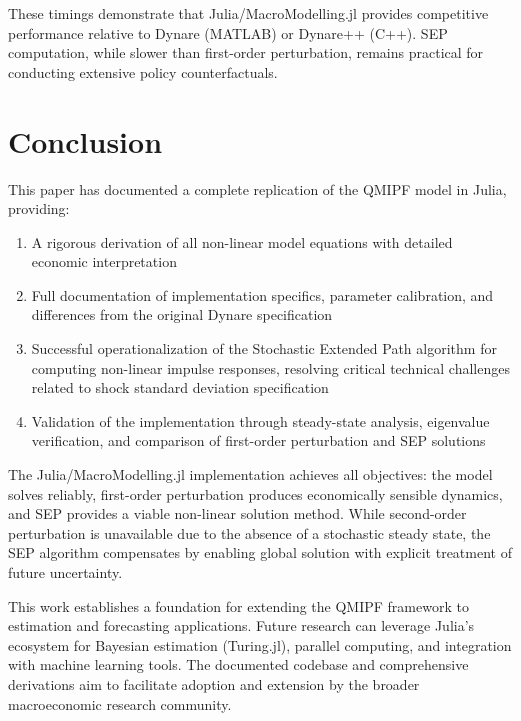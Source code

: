 \documentclass[12pt]{article}
\begin{document}
These timings demonstrate that Julia/MacroModelling.jl provides competitive performance relative to Dynare (MATLAB) or Dynare++ (C++). SEP computation, while slower than first-order perturbation, remains practical for conducting extensive policy counterfactuals.

\section{Conclusion}\label{sec:conclusion}

This paper has documented a complete replication of the QMIPF model in Julia, providing:
\begin{enumerate}
\item A rigorous derivation of all non-linear model equations with detailed economic interpretation
\item Full documentation of implementation specifics, parameter calibration, and differences from the original Dynare specification
\item Successful operationalization of the Stochastic Extended Path algorithm for computing non-linear impulse responses, resolving critical technical challenges related to shock standard deviation specification
\item Validation of the implementation through steady-state analysis, eigenvalue verification, and comparison of first-order perturbation and SEP solutions
\end{enumerate}

The Julia/MacroModelling.jl implementation achieves all objectives: the model solves reliably, first-order perturbation produces economically sensible dynamics, and SEP provides a viable non-linear solution method. While second-order perturbation is unavailable due to the absence of a stochastic steady state, the SEP algorithm compensates by enabling global solution with explicit treatment of future uncertainty.

This work establishes a foundation for extending the QMIPF framework to estimation and forecasting applications. Future research can leverage Julia's ecosystem for Bayesian estimation (Turing.jl), parallel computing, and integration with machine learning tools. The documented codebase and comprehensive derivations aim to facilitate adoption and extension by the broader macroeconomic research community.
\end{document}
